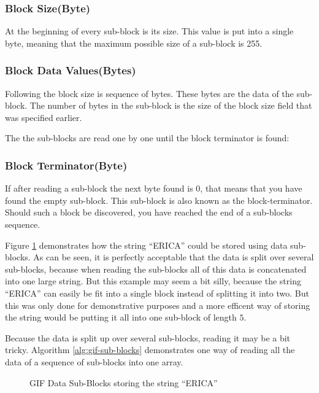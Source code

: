 \begin{refsection}
  \subsubsection*{Block Size(Byte)}

  At the beginning of every sub-block is its size. This value is put
  into a single byte, meaning that the maximum possible size of a
  sub-block is 255.

  \subsubsection*{Block Data Values(Bytes)}

  Following the block size is sequence of bytes. These bytes are the
  data of the sub-block. The number of bytes in the sub-block is the
  size of the block size field that was specified earlier.

  The the sub-blocks are read one by one until the block terminator is
  found:

  \subsubsection*{Block Terminator(Byte)}

  If after reading a sub-block the next byte found is 0, that means
  that you have found the empty sub-block. This sub-block is also
  known as the block-terminator. Should such a block be discovered, you
  have reached the end of a sub-blocks sequence.

  Figure \ref{fig:gif-data-sub-blocks} demonstrates how the string
  ``ERICA'' could be stored using data sub-blocks. As can be seen, it
  is perfectly acceptable that the data is split over several
  sub-blocks, because when reading the sub-blocks all of this data is
  concatenated into one large string. But this example may seem a bit
  silly, because the string ``ERICA'' can easily be fit into a single
  block instead of splitting it into two. But this was only done for
  demonstrative purposes and a more efficent way of storing the string
  would be putting it all into one sub-block of length $5$.

  Because the data is split up over several sub-blocks, reading it may
  be a bit tricky. Algorithm \ref{alg:gif-sub-blocks} demonstrates one way of reading all the
  data of a sequence of sub-blocks into one array.

  \begin{figure}
    \centering
    \caption{GIF Data Sub-Blocks storing the string ``ERICA''}
    \label{fig:gif-data-sub-blocks}
  \end{figure}


\end{refsection}
